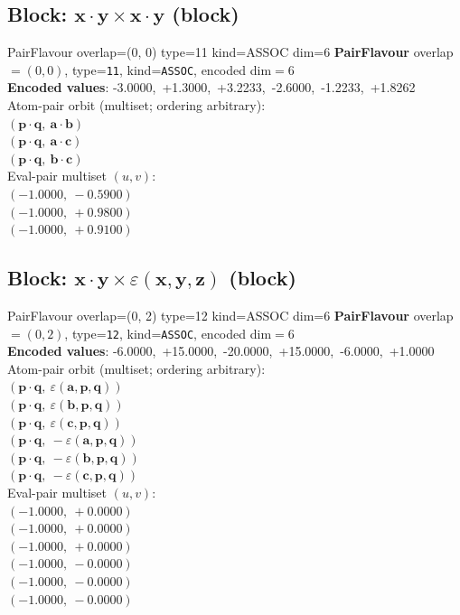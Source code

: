 \documentclass[a4paper,11pt]{article}
\newcommand{\pdcegfomjfhook}[2]{\mathbf{#1} \cdot \mathbf{#2}}
\newcommand{\kblbmcpggoncpf}[3]{\varepsilon(\mathbf{#1},\mathbf{#2},\mathbf{#3})}
\begin{document}
\subsection{Block: $\pdcegfomjfhook{x}{y} \times \pdcegfomjfhook{x}{y}$  (block)}
    PairFlavour  overlap=(0, 0)  type=11  kind=ASSOC  dim=6
\textbf{PairFlavour} overlap$=(0, 0)$, type=\texttt{11}, kind=\texttt{ASSOC}, encoded dim$=6$\\
\textbf{      Encoded values}: -3.0000,\ +1.3000,\ +3.2233,\ -2.6000,\ -1.2233,\ +1.8262\\
\quad Atom-pair orbit (multiset; ordering arbitrary):\\
$(\pdcegfomjfhook{p}{q},\ \pdcegfomjfhook{a}{b})$\\
$(\pdcegfomjfhook{p}{q},\ \pdcegfomjfhook{a}{c})$\\
$(\pdcegfomjfhook{p}{q},\ \pdcegfomjfhook{b}{c})$\\
\quad Eval-pair multiset $(u, v)$:\\
$(-1.0000,\ -0.5900)$\\
$(-1.0000,\ +0.9800)$\\
$(-1.0000,\ +0.9100)$\\

\subsection{Block: $\pdcegfomjfhook{x}{y} \times \kblbmcpggoncpf{x}{y}{z}$  (block)}
    PairFlavour  overlap=(0, 2)  type=12  kind=ASSOC  dim=6
\textbf{PairFlavour} overlap$=(0, 2)$, type=\texttt{12}, kind=\texttt{ASSOC}, encoded dim$=6$\\
\textbf{      Encoded values}: -6.0000,\ +15.0000,\ -20.0000,\ +15.0000,\ -6.0000,\ +1.0000\\
\quad Atom-pair orbit (multiset; ordering arbitrary):\\
$(\pdcegfomjfhook{p}{q},\ \kblbmcpggoncpf{a}{p}{q})$\\
$(\pdcegfomjfhook{p}{q},\ \kblbmcpggoncpf{b}{p}{q})$\\
$(\pdcegfomjfhook{p}{q},\ \kblbmcpggoncpf{c}{p}{q})$\\
$(\pdcegfomjfhook{p}{q},\ -\kblbmcpggoncpf{a}{p}{q})$\\
$(\pdcegfomjfhook{p}{q},\ -\kblbmcpggoncpf{b}{p}{q})$\\
$(\pdcegfomjfhook{p}{q},\ -\kblbmcpggoncpf{c}{p}{q})$\\
\quad Eval-pair multiset $(u, v)$:\\
$(-1.0000,\ +0.0000)$\\
$(-1.0000,\ +0.0000)$\\
$(-1.0000,\ +0.0000)$\\
$(-1.0000,\ -0.0000)$\\
$(-1.0000,\ -0.0000)$\\
$(-1.0000,\ -0.0000)$\\
\end{document}

